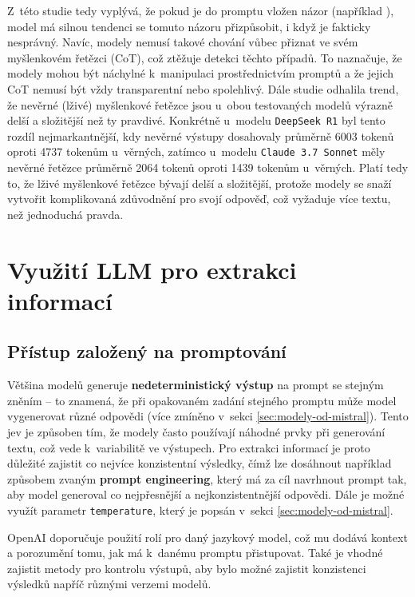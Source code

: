 \documentclass[czech, bc, kiv, he, iso690numb, pdf]{fasthesis}
\begin{document}
Z~této studie tedy vyplývá, že pokud je do promptu vložen názor (například ), model má silnou tendenci se tomuto názoru přizpůsobit, i když je fakticky nesprávný. Navíc, modely nemusí takové chování vůbec přiznat ve svém myšlenkovém řetězci (CoT), což ztěžuje detekci těchto případů. To naznačuje, že modely mohou být náchylné k~manipulaci prostřednictvím promptů a že jejich CoT nemusí být vždy transparentní nebo spolehlivý. Dále studie odhalila trend, že nevěrné (lživé) myšlenkové řetězce jsou u~obou testovaných modelů výrazně delší a složitější než ty pravdivé. Konkrétně u~modelu \verb"DeepSeek R1" byl tento rozdíl nejmarkantnější, kdy nevěrné výstupy dosahovaly průměrně 6003 tokenů oproti 4737 tokenům u~věrných, zatímco u~modelu \verb"Claude 3.7 Sonnet" měly nevěrné řetězce průměrně 2064 tokenů oproti 1439 tokenům u~věrných. Platí tedy to, že lživé myšlenkové řetězce bývají delší a složitější, protože modely se snaží vytvořit komplikovaná zdůvodnění pro svojí odpověď, což vyžaduje více textu, než jednoduchá pravda.


\section{Využití LLM pro extrakci informací}
\subsection{Přístup založený na promptování}
Většina modelů generuje \textbf{nedeterministický výstup} na prompt se stejným zněním -- to znamená, že při opakovaném zadání stejného promptu může model vygenerovat různé odpovědi (více zmíněno v~sekci \ref{sec:modely-od-mistral}). Tento jev je způsoben tím, že modely často používají náhodné prvky při generování textu, což vede k~variabilitě ve výstupech. Pro extrakci informací je proto důležité zajistit co nejvíce konzistentní výsledky, čímž lze dosáhnout například způsobem zvaným \textbf{prompt engineering}, který má za cíl navrhnout prompt tak, aby model generoval co nejpřesnější a nejkonzistentnější odpovědi. Dále je možné využít parametr \verb"temperature", který je popsán v~sekci \ref{sec:modely-od-mistral}.

OpenAI \cite{openai-platform-docs-text} doporučuje použití rolí pro daný jazykový model, což mu dodává kontext a porozumění tomu, jak má k~danému promptu přistupovat. Také je vhodné zajistit metody pro kontrolu výstupů, aby bylo možné zajistit konzistenci výsledků napříč různými verzemi modelů.
\end{document}
